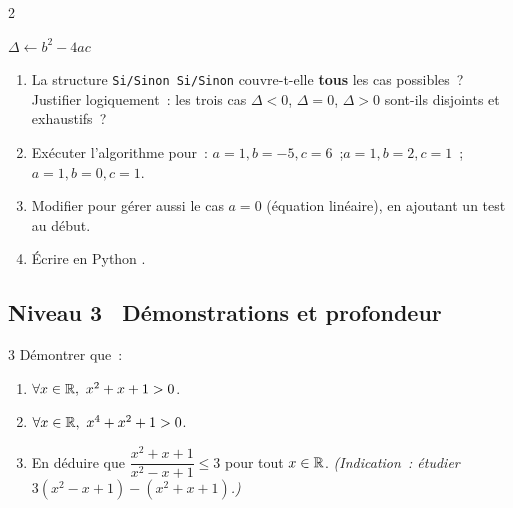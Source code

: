 \begin{exo}[\logicoalgo\ Algorithme~: r\'esoudre $ax^2+bx+c=0$ \corrige]{2}

\begin{algorithm}[H]
\caption{R\'esolution de l'\'equation du second degr\'e}
$\Delta \leftarrow b^2 - 4ac$\;
\end{algorithm}

\begin{enumerate}
  \item La structure \texttt{Si/Sinon Si/Sinon} couvre-t-elle \textbf{tous}
        les cas possibles~? Justifier logiquement~: les trois cas
        $\Delta<0$, $\Delta=0$, $\Delta>0$ sont-ils disjoints et exhaustifs~?
  \item Ex\'ecuter l'algorithme pour~:
        $a=1, b=-5, c=6$~;\quad $a=1, b=2, c=1$~;\quad $a=1, b=0, c=1$.
  \item Modifier pour g\'erer aussi le cas $a=0$
        (\'equation lin\'eaire), en ajoutant un test au d\'ebut.
  \item \'Ecrire en Python \computer.
\end{enumerate}
\end{exo}

\subsection*{\quad Niveau 3 \textemdash\ D\'emonstrations et profondeur}

\begin{exo}{3}
D\'emontrer que~:
\begin{enumerate}
  \item $\forall x \in \mathbb{R},\ x^2 + x + 1 > 0$.
  \item $\forall x \in \mathbb{R},\ x^4 + x^2 + 1 > 0$.
  \item En d\'eduire que $\dfrac{x^2+x+1}{x^2-x+1} \leq 3$ pour tout $x\in\mathbb{R}$.
        \emph{(Indication~: \'etudier $3(x^2-x+1)-(x^2+x+1)$.)}
\end{enumerate}
\end{exo}

